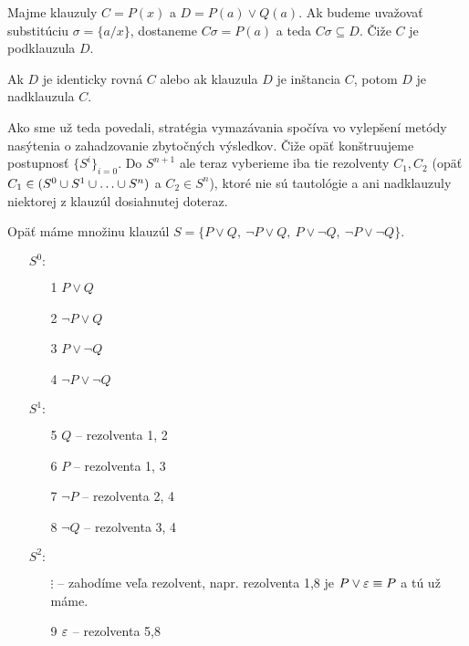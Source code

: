 \begin{priklad}
    Majme klauzuly $C = P(x)$ a $D = P(a) \lor Q(a)$.
    Ak budeme uvažovať substitúciu $\sigma = \{a/x\}$, dostaneme
    $C\sigma = P(a)$ a teda $C\sigma \subseteq D$.
    Čiže $C$ je podklauzula $D$.
\end{priklad}

\begin{poznamka}
    Ak $D$ je identicky rovná $C$ alebo ak klauzula $D$ je inštancia $C$, 
    potom $D$ je nadklauzula $C$.
\end{poznamka}


Ako sme už teda povedali, stratégia vymazávania spočíva vo vylepšení metódy
nasýtenia o zahadzovanie zbytočných výsledkov.
Čiže opäť konštruujeme postupnosť $\{S^i\}_{i=0}$.
Do $S^{n+1}$ ale teraz vyberieme iba tie rezolventy $C_1, C_2$ 
(opäť $C_1 \in (S^0 \union S^1 \union \dots \union S^n)$ a $C_2 \in S^n$),
ktoré nie sú tautológie a ani nadklauzuly niektorej z klauzúl dosiahnutej
doteraz.

\begin{priklad}
    Opäť máme množinu klauzúl $S=\{P\lor Q,\ \neg P\lor Q,\ 
        P \lor \neg Q,\ \neg P \lor \neg Q\}$.

    \begin{itemize}
    \item[$S^0:$]
        \begin{itemize}
            \item[1] $P\lor Q$
            \item[2] $\neg P \lor Q$
            \item[3] $P\lor \neg Q$
            \item[4] $\neg P \lor \neg Q$
        \end{itemize}

    \item[$S^1:$]
        \begin{itemize}
        \item[5] $Q$ -- rezolventa 1, 2
        \item[6] $P$ -- rezolventa 1, 3
        \item[7] $\neg P$ -- rezolventa 2, 4
        \item[8] $\neg Q$ -- rezolventa 3, 4
        \end{itemize}

    \item[$S^2:$]
        \begin{itemize}
            \item[$\vdots$] -- zahodíme veľa rezolvent, napr. rezolventa
                1,8 je $P \lor \varepsilon \equiv P$ a tú už máme.
            \item[9] $\varepsilon$ -- rezolventa 5,8
        \end{itemize}
    \end{itemize}
\end{priklad}

